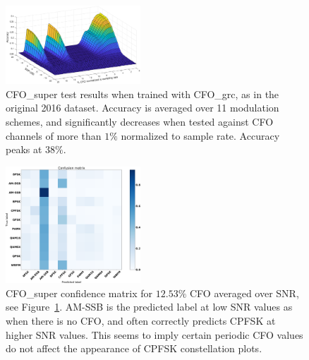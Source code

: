 \begin{figure}[ht!]
	\centering	\includegraphics[width=0.45\textwidth,keepaspectratio]{figs/rml2016_tencfo.eps}
    \caption{CFO\_super test results when trained with CFO\_grc, as in the original 2016 dataset. Accuracy is averaged over 11 modulation schemes, and significantly decreases when tested against CFO channels of more than $1\%$ normalized to sample rate. Accuracy peaks at $38\%$.} 
\label{fig:cfo}      
\end{figure}

\begin{figure}[ht!]
	\centering	\includegraphics[width=0.45\textwidth,keepaspectratio]{figs/confusion.eps}
    \caption{CFO\_super confidence matrix for $12.53\%$ CFO averaged over SNR, see Figure~\ref{fig:cfo}. AM-SSB is the predicted label at low SNR values as when there is no CFO, and often correctly predicts CPFSK at higher SNR values. This seems to imply certain periodic CFO values do not affect the appearance of CPFSK constellation plots.} 
\label{fig:confusion}      
\end{figure}

